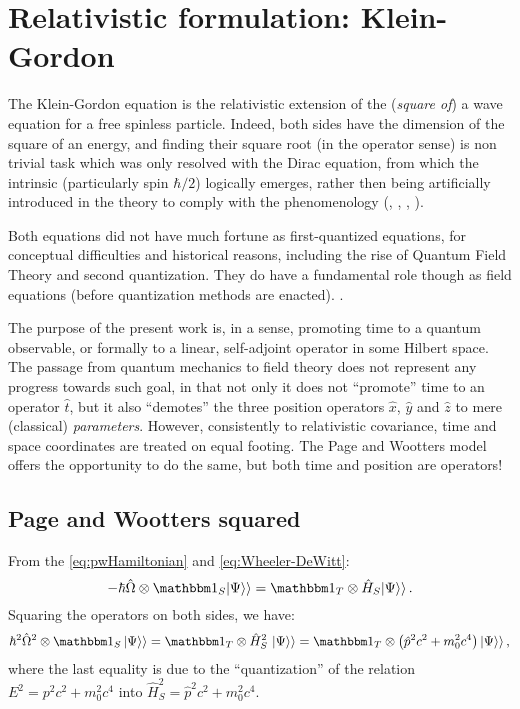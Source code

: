 \section{Relativistic formulation: Klein-Gordon}

The Klein-Gordon equation is the relativistic extension of the
(\emph{square of}) a wave equation for a free spinless particle.
Indeed, both sides have the dimension of
the square of an energy, and finding their square root
(in the operator sense) is non trivial task which was only resolved 
with the Dirac equation, from which the
intrinsic  (particularly spin $\hbar/2$) logically emerges,
rather then being artificially introduced in the theory
to comply with the phenomenology
(\cite{Greiner_Rel}, \cite[Ch. 8]{Sakurai2}, \cite{DiracEquation}, \cite[handout 2]{Webber_notes}).

Both equations did not have much fortune as first-quantized equations,
for conceptual difficulties and historical reasons, including the rise
of Quantum Field Theory and second quantization. They do have a fundamental
role though as field equations (before quantization methods are enacted).
\parencite{PeskinSchroeder}.

The purpose of the present work is, in a sense, promoting time to a quantum
observable, or formally to a linear, self-adjoint operator in some Hilbert space.
The passage from quantum mechanics to field theory does not represent any progress
towards such goal, in that not only it does not ``promote'' time to an operator $\hat{t}$,
but it also ``demotes'' the three position operators $\hat{x}$, $\hat{y}$ and $\hat{z}$
to mere (classical) \emph{parameters}. However, consistently to relativistic covariance,
time and space coordinates are treated on equal footing. The Page and Wootters model
offers the opportunity to do the same, but both time and position are operators!

\subsection{Page and Wootters squared}

From the \eqref{eq:pwHamiltonian} and \eqref{eq:Wheeler-DeWitt}:
\begin{equation}\label{eq:pw_to_be_squared}
  -\hbar\hat{\Omega}\ox\idop_S \dket{\Psi} = \idop_T\ox\hat{H}_S \dket{\Psi} \,\text{.}
\end{equation}
Squaring the operators on both sides, we have:
\begin{equation}\label{eq:pw_squared}
  \hbar^{2}\hat{\Omega}^{2}\ox\idop_S \, \dket{\Psi} = \idop_T\ox\hat{H}_S^{2} \,\, \dket{\Psi} 
    = \idop_T \ox \left( \hat{p}^2 c^2 + m_0^2 c^4 \right) \dket{\Psi} \,\text{,}
\end{equation}
where the last equality is due to the ``quantization'' of the relation $E^2 = p^2 c^2 + m_0^2 c^4$
into $\hat{H}_S^{2} = \hat{p}^2 c^2 + m_0^2 c^4$.

